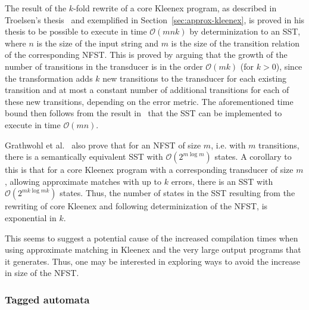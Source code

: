 The result of the $k$-fold rewrite of a core Kleenex program, as described in
Troelsen's thesis~\cite{troelsen2016approximate} and exemplified in
Section~\ref{sec:approx-kleenex}, is proved in his thesis to be possible to
execute in time $\mathcal{O}(mnk)$ by determinization to an SST, where $n$ is
the size of the input string and $m$ is the size of the transition relation of
the corresponding NFST. This is proved by arguing that the growth of the number
of transitions in the transducer is in the order $\mathcal{O}(mk)$ (for $k>0$),
since the transformation adds $k$ new transitions to the transducer for each
existing transition and at most a constant number of additional transitions for
each of these new transitions, depending on the error metric. The
aforementioned time bound then follows from the result
in~\cite{grathwohl2016kleenex} that the SST can be implemented to execute in
time $\mathcal{O}(mn)$.


Grathwohl et al.~\cite{grathwohl2016kleenex} also prove that for an NFST of
size $m$, i.e. with $m$ transitions, there is a semantically equivalent SST
with $\mathcal{O}(2^{m \log m})$ states. A corollary to this is that for a core
Kleenex program with a corresponding transducer of size $m$, allowing
approximate matches with up to $k$ errors, there is an SST with
$\mathcal{O}(2^{mk \log mk})$ states. Thus, the number of states in the SST
resulting from the rewriting of core Kleenex and following determinization of
the NFST, is exponential in $k$.

This seems to suggest a potential cause of the increased compilation times when
using approximate matching in Kleenex and the very large output programs that
it generates. Thus, one may be interested in exploring ways to avoid the
increase in size of the NFST.




\subsubsection{Tagged automata}


